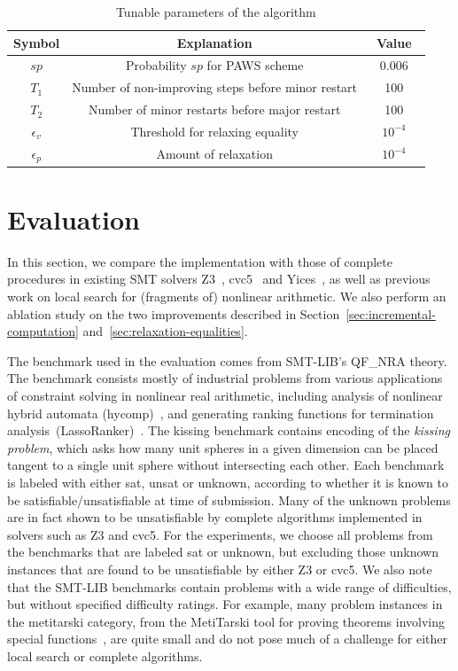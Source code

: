 \documentclass[runningheads]{llncs}
\begin{document}
\begin{table}[]
    \centering
    \begin{tabular}{c|c|c}
      Symbol & Explanation & ~Value~ \\ \hline
      $\mathit{sp}$ & Probability $\mathit{sp}$ for PAWS scheme & 0.006 \\
      $T_1$ & Number of non-improving steps before minor restart & 100 \\
      $T_2$ & Number of minor restarts before major restart & 100 \\
      $\epsilon_v$ & Threshold for relaxing equality & $10^{-4}$ \\
      $\epsilon_p$ & Amount of relaxation & $10^{-4}$ \\ \hline
    \end{tabular}
    \vspace{2mm}
    \caption{Tunable parameters of the algorithm}
    \label{tab:parameters}
\end{table}

\section{Evaluation}
\label{sec:evaluation}

In this section, we compare the implementation with those of complete procedures in existing SMT solvers Z3~\cite{MouraB08}, cvc5~\cite{BarbosaBBKLMMMN22} and Yices~\cite{Dutertre14}, as well as previous work on local search for (fragments of) nonlinear arithmetic. We also perform an ablation study on the two improvements described in Section~\ref{sec:incremental-computation} and~\ref{sec:relaxation-equalities}.

The benchmark used in the evaluation comes from SMT-LIB's QF\_NRA theory. The benchmark consists mostly of industrial problems from various applications of constraint solving in nonlinear real arithmetic, including analysis of nonlinear hybrid automata (\textsf{hycomp})~\cite{CimattiMT12}, and generating ranking functions for termination analysis~(\textsf{LassoRanker})~\cite{HeizmannHLP13,LeikeH15}. The \textsf{kissing} benchmark contains encoding of the \emph{kissing problem}, which asks how many unit spheres in a given dimension can be placed tangent to a single unit sphere without intersecting each other. Each benchmark is labeled with either \textsf{sat}, \textsf{unsat} or \textsf{unknown}, according to whether it is known to be satisfiable/unsatisfiable at time of submission. Many of the \textsf{unknown} problems are in fact shown to be unsatisfiable by complete algorithms implemented in solvers such as Z3 and cvc5. For the experiments, we choose all problems from the benchmarks that are labeled \textsf{sat} or \textsf{unknown}, but excluding those \textsf{unknown} instances that are found to be unsatisfiable by either Z3 or cvc5. We also note that the SMT-LIB benchmarks contain problems with a wide range of difficulties, but without specified difficulty ratings. For example, many problem instances in the \textsf{metitarski} category, from the MetiTarski tool for proving theorems involving special functions~\cite{AkbarpourP10}, are quite small and do not pose much of a challenge for either local search or complete algorithms.
\end{document}
